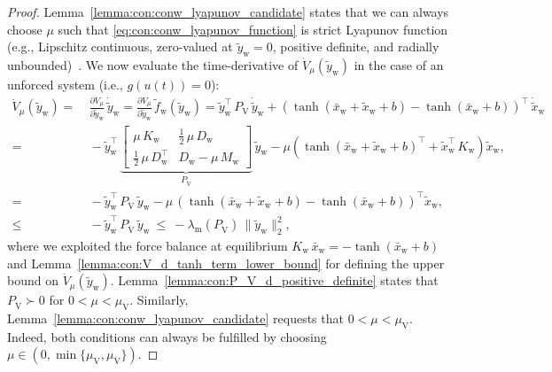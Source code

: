 \begin{proof}
    Lemma~\ref{lemma:con:conw_lyapunov_candidate} states that we can always choose $\mu$ such that \eqref{eq:con:conw_lyapunov_function} is strict Lyapunov function (e.g., Lipschitz continuous, zero-valued at $\tilde{y}_\mathrm{w} = 0$, positive definite, and radially unbounded)~\citep{khalil2002nonlinear, wu2022passive}. We now evaluate the time-derivative of $\dot{V}_\mu(\tilde{y}_\mathrm{w})$ in the case of an unforced system (i.e., $g(u(t)) = 0$):
    \begin{equation}\label{eq:con:lyapunov_function_time_derivative}
    \begin{split}
        \dot{V}_\mu(\tilde{y}_\mathrm{w}) =& \: \frac{\partial V_\mu}{\partial \tilde{y}_\mathrm{w}} \, \dot{\tilde{y}}_\mathrm{w} = \frac{\partial V_\mu}{\partial \tilde{y}_\mathrm{w}} \, \tilde{f}_\mathrm{w}(\tilde{y}_\mathrm{w}) 
        = \tilde{y}_\mathrm{w}^\top \, P_\mathrm{V} \, \dot{\tilde{y}}_\mathrm{w} + \left (\tanh(\bar{x}_\mathrm{w} + \tilde{x}_\mathrm{w} + b) - \tanh(\bar{x}_\mathrm{w} + b)\right )^\top \, \dot{\tilde{x}}_\mathrm{w}\\
        =& \: -\tilde{y}_\mathrm{w}^\top \, \underbrace{\begin{bmatrix}
            \mu \, K_\mathrm{w} & \frac{1}{2} \, \mu \, D_\mathrm{w}\\
            \frac{1}{2} \, \mu \, D_\mathrm{w}^\top & D_\mathrm{w} - \mu \, M_\mathrm{w}
        \end{bmatrix}}_{P_{\dot{\mathrm{V}}}} \, \tilde{y}_\mathrm{w} - \mu \left ( \tanh(\bar{x}_\mathrm{w} + \tilde{x}_\mathrm{w} + b)^\top + \tilde{x}_\mathrm{w}^\top \, K_\mathrm{w} \right ) \tilde{x}_\mathrm{w},\\
        =& \: -\tilde{y}_\mathrm{w}^\top \, P_{\dot{\mathrm{V}}} \, \tilde{y}_\mathrm{w} - \mu \, \left ( \tanh(\bar{x}_\mathrm{w} + \tilde{x}_\mathrm{w} + b) - \tanh(\bar{x}_\mathrm{w} + b) \right )^\top \tilde{x}_\mathrm{w},\\
        \leq& \: -\tilde{y}_\mathrm{w}^\top \, P_{\dot{\mathrm{V}}} \, \tilde{y}_\mathrm{w} 
        \: \leq \: -\lambda_\mathrm{m}\left(P_{\dot{\mathrm{V}}} \right) \, \lVert \tilde{y}_\mathrm{w} \rVert_2^2,
    \end{split}
    \end{equation}
    where we exploited the force balance at equilibrium $K_\mathrm{w} \, \bar{x}_\mathrm{w} = -\tanh(\bar{x}_\mathrm{w} + b)$ and Lemma~\ref{lemma:con:V_d_tanh_term_lower_bound} for defining the upper bound on $\dot{V}_\mu(\tilde{y}_\mathrm{w})$. Lemma~\ref{lemma:con:P_V_d_positive_definite} states that $P_{\dot{\mathrm{V}}} \succ 0$ for $0 < \mu < \mu_{\dot{\mathrm{V}}}$. Similarly, Lemma~\ref{lemma:con:conw_lyapunov_candidate} requests that $0 < \mu < \mu_{\mathrm{V}}$. Indeed, both conditions can always be fulfilled by choosing $\mu \in \left (0, \min \{ \mu_{\mathrm{V}}, \mu_{\dot{\mathrm{V}}} \} \right )$. 

\end{proof}
